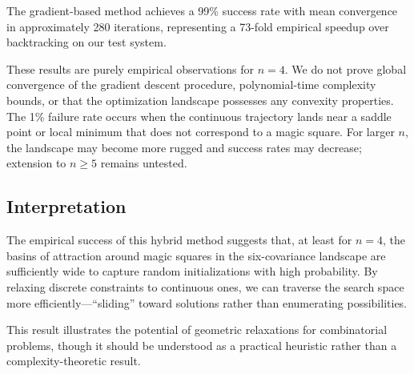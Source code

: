 The gradient-based method achieves a 99\% success rate with mean convergence in approximately 280 iterations, representing a 73-fold empirical speedup over backtracking on our test system.

\begin{remark}
These results are purely empirical observations for $n=4$. We do not prove global convergence of the gradient descent procedure, polynomial-time complexity bounds, or that the optimization landscape possesses any convexity properties. The 1\% failure rate occurs when the continuous trajectory lands near a saddle point or local minimum that does not correspond to a magic square. For larger $n$, the landscape may become more rugged and success rates may decrease; extension to $n \geq 5$ remains untested.
\end{remark}

\subsection{Interpretation}

The empirical success of this hybrid method suggests that, at least for $n=4$, the basins of attraction around magic squares in the six-covariance landscape are sufficiently wide to capture random initializations with high probability. By relaxing discrete constraints to continuous ones, we can traverse the search space more efficiently---``sliding'' toward solutions rather than enumerating possibilities.

This result illustrates the potential of geometric relaxations for combinatorial problems, though it should be understood as a practical heuristic rather than a complexity-theoretic result.
